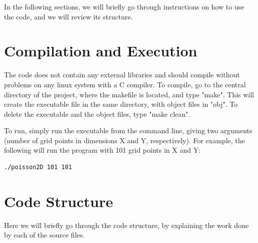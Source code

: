 \documentclass[11pt]{report}
\begin{document}
In the following sections, we will briefly go through instructions on how to use the code, and we will review its structure.

\section{Compilation and Execution}
The code does not contain any external libraries and should compile without problems on any linux system with a C compiler. To compile, go to the central directory of the project, where the makefile is located, and type "make". This will create the executable file in the same directory, with object files in "obj". To delete the executable and the object files, type "make clean".

To run, simply run the executable from the command line, giving two arguments (number of grid points in dimensions X and Y, respectively). For example, the following will run the program with 101 grid points in X and Y:

\begin{lstlisting}
./poisson2D 101 101
\end{lstlisting}

\section{Code Structure}
Here we will briefly go through the code structure, by explaining the work done by each of the source files. 
\end{document}
